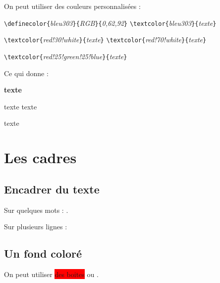 \documentclass[a4paper, 11pt]{article}
\begin{document}
            On peut utiliser des couleurs personnalisées :

            \begin{flushleft}
                \verb!\definecolor{!\textit{bleu303}\verb!}{!\textit{RGB}\verb!}{!\textit{0,62,92}\verb!}!
                \verb!\textcolor{!\textit{bleu303}\verb!}{!\textit{texte}\verb!}!

                \verb!\textcolor{!\textit{red!30!white}\verb!}{!\textit{texte}\verb!}!
                \verb!\textcolor{!\textit{red!70!white}\verb!}{!\textit{texte}\verb!}!

                \verb!\textcolor{!\textit{red!25!green!25!blue}\verb!}{!\textit{texte}\verb!}!
            \end{flushleft}

            Ce qui donne :

            \begin{flushleft}
                \sffamily\bfseries
                \textcolor{bleu303}{texte}
                
                \textcolor{red!30!white}{texte}
                \textcolor{red!70!white}{texte}

                \textcolor{red!40!blue!40!black}{texte}
            \end{flushleft}

    \section{Les cadres}

        \subsection{Encadrer du texte}

            Sur quelques mots : .

            Sur plusieurs lignes :

        \subsection{Un fond coloré}

            On peut utiliser \colorbox{red}{des boites} ou .
\end{document}
